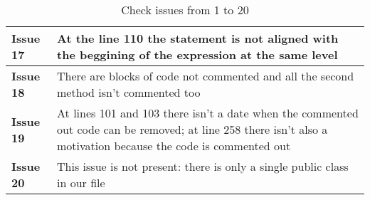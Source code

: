 \begin{table}[htbp]
\begin{center}
\begin{tabular}{l|p{}}
\hline
\textbf{Issue 17} & At the line 110 the statement is not aligned with the beggining of the expression at the same level \\
\hline
\textbf{Issue 18} & There are blocks of code not commented and all the second method isn't commented too\\
\hline
\textbf{Issue 19} & At lines 101 and 103 there isn't a date when the commented out code can be removed; at line 258 there isn't also a motivation because the code is commented out\\
\hline
\textbf{Issue 20} & This issue is not present: there is only a single public class in our file\\
\hline
\end{tabular}
\caption{Check issues from 1 to 20}
\end{center}
\end{table}

